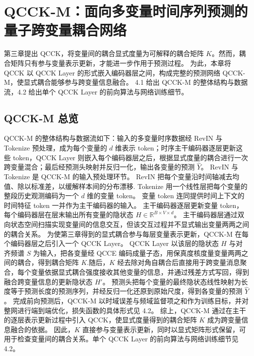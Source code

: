 


\section{QCCK-M：面向多变量时间序列预测的量子跨变量耦合网络}

第三章提出 QCCK，将变量间的耦合显式度量为可解释的耦合矩阵 $K$。然而，耦合矩阵只有参与变量表示更新，才能进一步作用于预测过程。
为此，本章将 QCCK 以 QCCK Layer 的形式嵌入编码器层之间，构成完整的预测网络 QCCK-M，使显式耦合能够参与跨变量信息融合。
4.1 给出 QCCK-M 的整体结构与数据流，4.2 给出单个 QCCK Layer 的前向算法与网络训练细节。

\subsection{QCCK-M 总览}

QCCK-M 的整体结构与数据流如下：输入的多变量时序数据经 RevIN 与 Tokenize 预处理，成为每个变量的 $d$ 维表示 token；时序主干编码器逐层更新这些 token，QCCK Layer 则嵌入每个编码器层之后，根据显式度量的耦合进行一次跨变量混合；最后经预测头映射并反归一化，输出各变量的预测 $\hat{Y}$。
RevIN 与 Tokenize 是 QCCK-M 的输入预处理环节。
RevIN 把每个变量沿时间轴减去均值、除以标准差，以缓解样本间的分布漂移.
Tokenize 用一个线性层把每个变量的整段历史观测编码为一个 $d$ 维的变量 token。
变量 token 连同提供时间上下文的时间特征 token 一并作为主干编码器的输入。
主干编码器逐层更新变量 token，每个编码器层在层末输出所有变量的隐状态 $H\in\mathbb{R}^{B\times V\times d}$。
主干编码器层通过双向状态空间扫描实现变量间的信息交互，但该交互过程并不显式输出变量两两之间的耦合关系。
为使第三章得到的显式耦合参与每层变量表示更新，QCCK-M 在每个编码器层之后引入一个 QCCK Layer。
QCCK Layer 以该层的隐状态 $H$ 与对齐频谱 $S$ 为输入，把各变量经 QCCE 编码成量子态，用保真度核度量变量两两之间的耦合，得到耦合矩阵 $K$.随后，$K$ 经去除对角自耦合后直接用于跨变量消息聚合，每个变量依据显式耦合强度接收其他变量的信息，并通过残差方式写回，得到融合跨变量信息的更新隐状态 $H'$。
预测头把每个变量的最终隐状态线性映射为长度等于预测长度的预测序列，并经反归一化还原到原始尺度，得到各变量的预测 $\hat{Y}$。
完成前向预测后，QCCK-M 以时域误差与频域监督项之和作为训练目标，并对整网进行端到端优化，损失函数的具体形式见 4.2。
综上，QCCK-M 通过在主干的逐层表示更新过程中引入 QCCK，使显式度量得到的耦合矩阵 $K$ 成为跨变量信息融合的依据。
因此，$K$ 直接参与变量表示更新，同时以显式矩阵形式保留，可用于检查变量间的耦合关系。单个 QCCK Layer 的前向算法与网络训练细节见 4.2。


